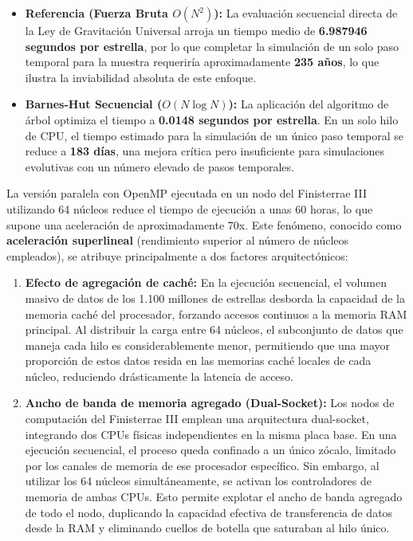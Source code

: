 \begin{itemize}
    \item \textbf{Referencia (Fuerza Bruta $O(N^2)$):} La evaluación secuencial directa de la Ley de Gravitación Universal arroja un tiempo medio de \textbf{6.987946 segundos por estrella}, por lo que completar la simulación de un solo paso temporal para la muestra requeriría aproximadamente \textbf{235 años}, lo que ilustra la inviabilidad absoluta de este enfoque.
    \item \textbf{Barnes-Hut Secuencial ($O(N \log N)$):} La aplicación del algoritmo de árbol optimiza el tiempo a \textbf{0.0148 segundos por estrella}. En un solo hilo de CPU, el tiempo estimado para la simulación de un único paso temporal se reduce a \textbf{183 días}, una mejora crítica pero insuficiente para simulaciones evolutivas con un número elevado de pasos temporales.
\end{itemize}
La versión paralela con OpenMP ejecutada en un nodo del Finisterrae III utilizando 64 núcleos reduce el tiempo de ejecución a unas 60 horas, lo que supone una aceleración de aproximadamente 70x.
Este fenómeno, conocido como \textbf{aceleración superlineal} (rendimiento superior al número de núcleos empleados), se atribuye principalmente a dos factores arquitectónicos:
\begin{enumerate}
    \item \textbf{Efecto de agregación de caché:} En la ejecución secuencial, el volumen masivo de datos de los 1.100 millones de estrellas desborda la capacidad de la memoria caché del procesador, forzando accesos continuos a la memoria RAM principal.
    Al distribuir la carga entre 64 núcleos, el subconjunto de datos que maneja cada hilo es considerablemente menor, permitiendo que una mayor proporción de estos datos resida en las memorias caché locales de cada núcleo, reduciendo drásticamente la latencia de acceso.
    \item \textbf{Ancho de banda de memoria agregado (Dual-Socket):} Los nodos de computación del Finisterrae III emplean una arquitectura dual-socket, integrando dos CPUs físicas independientes en la misma placa base.
    En una ejecución secuencial, el proceso queda confinado a un único zócalo, limitado por los canales de memoria de ese procesador específico.
    Sin embargo, al utilizar los 64 núcleos simultáneamente, se activan los controladores de memoria de ambas CPUs.
    Esto permite explotar el ancho de banda agregado de todo el nodo, duplicando la capacidad efectiva de transferencia de datos desde la RAM y eliminando cuellos de botella que saturaban al hilo único.
\end{enumerate}

